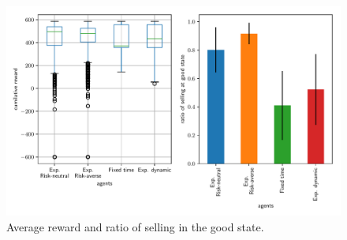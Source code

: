 \begin{figure}
    \centering
    \includegraphics[width=0.8\linewidth]{img/performance.pdf}
    \caption{Average reward and ratio of selling in the good state.}
\end{figure}
